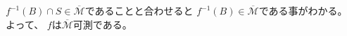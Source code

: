 \documentclass[12pt,b5paper]{ltjsarticle}
\begin{document}
\begin{enumerate}
      $f^{-1}(B) \cap S \in \overline{\mathcal{M}}$であることと合わせると
      $f^{-1}(B) \in \overline{\mathcal{M}}$である事がわかる。
      よって、
      $f$は$\overline{\mathcal{M}}$可測である。
      

%
%      
%
%
%
%

      \hrulefill
\end{enumerate}
\hrulefill
\end{document}
